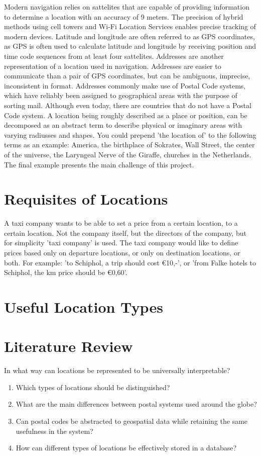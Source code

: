 Modern navigation relies on sattelites that are capable of providing information to determine a location with an accuracy of 9 meters. The precision of hybrid methods using cell towers and Wi-Fi Location Services enables precise tracking of modern devices. Latitude and longitude are often referred to as GPS coordinates, as GPS is often used to calculate latitude and longitude by receiving position and time code sequences from at least four sattelites. Addresses are another representation of a location used in navigation. Addresses are easier to communicate than a pair of GPS coordinates, but can be ambiguous, imprecise, inconsistent in format. Addresses commonly make use of Postal Code systems, which have reliably been assigned to geographical areas with the purpose of sorting mail. Although even today, there are countries that do not have a Postal Code system.
A location being roughly described as a place or position, can be decomposed as an abstract term to describe physical or imaginary areas with varying radiusses and shapes. You could prepend 'the location of' to the following terms as an example: America, the birthplace of Sokrates, Wall Street, the center of the universe, the Laryngeal Nerve of the Giraffe, churches in the Netherlands. The final example presents the main challenge of this project.

\section{Requisites of Locations}

A taxi company wants to be able to set a price from a certain location, to a certain location. Not the company itself, but the directors of the company, but for simplicity 'taxi company' is used. The taxi company would like to define prices based only on departure locations, or only on destination locations, or both. For example: 'to Schiphol, a trip should cost \euro 10,-', or 'from Falke hotels to Schiphol, the km price should be \euro 0,60'.

\section{Useful Location Types}
\section{Literature Review}



In what way can locations be represented to be universally interpretable?
\begin{enumerate}
  \item Which types of locations should be distinguished?
  \item What are the main differences between postal systems used around the globe?
  \item Can postal codes be abstracted to geospatial data while retaining the same usefulness in the system?
  \item How can different types of locations be effectively stored in a database?
\end{enumerate}

